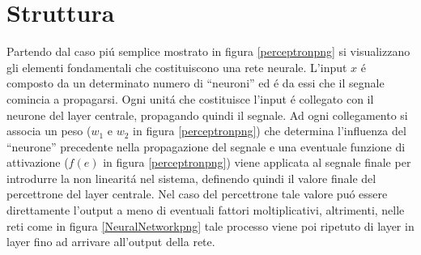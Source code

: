 \documentclass[a4paper,12pt]{report}
\begin{document}
 \section{Struttura} 
 Partendo dal caso pi\'u semplice mostrato in figura \ref{perceptronpng} si visualizzano gli elementi fondamentali che costituiscono una rete neurale. 
 L'input $x$ \'e composto da un determinato numero di ``neuroni'' ed \'e da essi che il segnale comincia a propagarsi. 
 Ogni unit\'a che costituisce l'input \'e collegato con il neurone del layer centrale, propagando quindi il segnale. 
 Ad ogni collegamento si associa un peso ($w_1$ e $w_2$ in figura \ref{perceptronpng}) che determina l'influenza del ``neurone'' precedente nella propagazione del segnale e una eventuale funzione di attivazione ($f(e)$ in figura \ref{perceptronpng}) viene applicata al segnale finale per introdurre la non linearit\'a nel sistema, definendo quindi il valore finale del percettrone del layer centrale. 
 Nel caso del percettrone tale valore pu\'o essere direttamente l'output a meno di eventuali fattori moltiplicativi, altrimenti, nelle reti come in figura \ref{NeuralNetworkpng} tale processo viene poi ripetuto di layer in layer fino ad arrivare all'output della rete.
  
\end{document}
